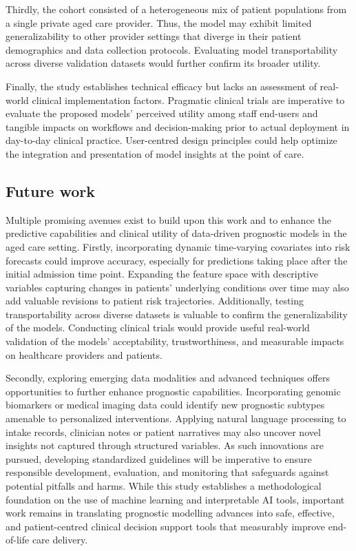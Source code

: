 \documentclass{article}
\begin{document}
Thirdly, the cohort consisted of a heterogeneous mix of patient populations from a single private aged care provider. Thus, the model may exhibit limited generalizability to other provider settings that diverge in their patient demographics and data collection protocols. Evaluating model transportability across diverse validation datasets would further confirm its broader utility.

Finally, the study establishes technical efficacy but lacks an assessment of real-world clinical implementation factors. Pragmatic clinical trials are imperative to evaluate the proposed models' perceived utility among staff end-users and tangible impacts on workflows and decision-making prior to actual deployment in day-to-day clinical practice. User-centred design principles could help optimize the integration and presentation of model insights at the point of care.


\subsection{Future work}

Multiple promising avenues exist to build upon this work and to enhance the predictive capabilities and clinical utility of data-driven prognostic models in the aged care setting. Firstly, incorporating dynamic time-varying covariates into risk forecasts could improve accuracy, especially for predictions taking place after the initial admission time point. Expanding the feature space with descriptive variables capturing changes in patients' underlying conditions over time may also add valuable revisions to patient risk trajectories. Additionally, testing transportability across diverse datasets is valuable to confirm the generalizability of the models. Conducting clinical trials would provide useful real-world validation of the models' acceptability, trustworthiness, and measurable impacts on healthcare providers and patients.

Secondly, exploring emerging data modalities and advanced techniques offers opportunities to further enhance prognostic capabilities. Incorporating genomic biomarkers or medical imaging data could identify new prognostic subtypes amenable to personalized interventions. Applying natural language processing to intake records, clinician notes or patient narratives may also uncover novel insights not captured through structured variables. As such innovations are pursued, developing standardized guidelines will be imperative to ensure responsible development, evaluation, and monitoring that safeguards against potential pitfalls and harms. While this study establishes a methodological foundation on the use of machine learning and interpretable AI tools, important work remains in translating prognostic modelling advances into safe, effective, and patient-centred clinical decision support tools that measurably improve end-of-life care delivery.
\end{document}
